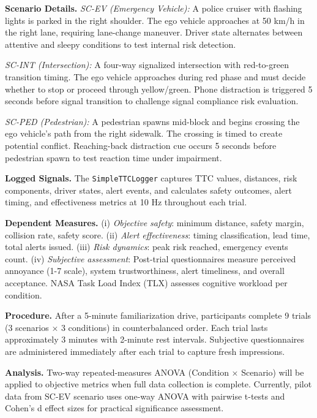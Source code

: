 \textbf{Scenario Details.}
\emph{SC-EV (Emergency Vehicle):} A police cruiser with flashing lights is 
parked in the right shoulder. The ego vehicle approaches at 50 km/h in the 
right lane, requiring lane-change maneuver. Driver state alternates between 
attentive and sleepy conditions to test internal risk detection.

\emph{SC-INT (Intersection):} A four-way signalized intersection with 
red-to-green transition timing. The ego vehicle approaches during red phase
and must decide whether to stop or proceed through yellow/green. Phone 
distraction is triggered 5 seconds before signal transition to challenge
signal compliance risk evaluation.

\emph{SC-PED (Pedestrian):} A pedestrian spawns mid-block and begins crossing
the ego vehicle's path from the right sidewalk. The crossing is timed to
create potential conflict. Reaching-back distraction cue occurs 5 seconds
before pedestrian spawn to test reaction time under impairment.

\vspace{0.5em}
\noindent\textbf{Logged Signals.}
The \texttt{SimpleTTCLogger} captures TTC values, distances, risk components,
driver states, alert events, and calculates safety outcomes, alert timing,
and effectiveness metrics at 10 Hz throughout each trial.

\textbf{Dependent Measures.}
(i) \emph{Objective safety}: minimum distance, safety margin, collision rate, safety score.
(ii) \emph{Alert effectiveness}: timing classification, lead time, total alerts issued.
(iii) \emph{Risk dynamics}: peak risk reached, emergency events count.
(iv) \emph{Subjective assessment}: Post-trial questionnaires measure perceived 
annoyance (1-7 scale), system trustworthiness, alert timeliness, and overall
acceptance. NASA Task Load Index (TLX) assesses cognitive workload per condition.

\textbf{Procedure.} After a 5-minute familiarization drive, participants complete
9 trials (3 scenarios × 3 conditions) in counterbalanced order. Each trial lasts
approximately 3 minutes with 2-minute rest intervals. Subjective questionnaires
are administered immediately after each trial to capture fresh impressions.

\textbf{Analysis.} Two-way repeated-measures ANOVA (Condition × Scenario) will be
applied to objective metrics when full data collection is complete. Currently,
pilot data from SC-EV scenario uses one-way ANOVA with pairwise t-tests and
Cohen's d effect sizes for practical significance assessment.

